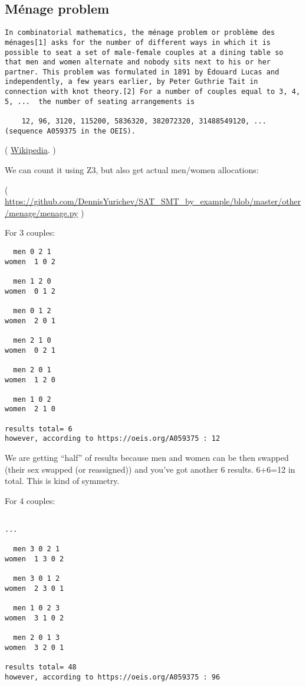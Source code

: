 \subsection{Ménage problem}

\begin{lstlisting}
In combinatorial mathematics, the ménage problem or problème des ménages[1] asks for the number of different ways in which it is possible to seat a set of male-female couples at a dining table so that men and women alternate and nobody sits next to his or her partner. This problem was formulated in 1891 by Édouard Lucas and independently, a few years earlier, by Peter Guthrie Tait in connection with knot theory.[2] For a number of couples equal to 3, 4, 5, ...  the number of seating arrangements is

    12, 96, 3120, 115200, 5836320, 382072320, 31488549120, ... (sequence A059375 in the OEIS). 
\end{lstlisting}

( \href{https://en.wikipedia.org/wiki/M%C3%A9nage_problem}{Wikipedia}. )

We can count it using Z3, but also get actual men/women allocations:



( \url{https://github.com/DennisYurichev/SAT_SMT_by_example/blob/master/other/menage/menage.py} )

For 3 couples:

\begin{lstlisting}
  men 0 2 1
women  1 0 2

  men 1 2 0
women  0 1 2

  men 0 1 2
women  2 0 1

  men 2 1 0
women  0 2 1

  men 2 0 1
women  1 2 0

  men 1 0 2
women  2 1 0

results total= 6
however, according to https://oeis.org/A059375 : 12
\end{lstlisting}

We are getting ``half'' of results because men and women can be then swapped (their sex swapped (or reassigned))
and you've got another 6 results.
6+6=12 in total.
This is kind of symmetry.

For 4 couples:

\begin{lstlisting}

...

  men 3 0 2 1
women  1 3 0 2

  men 3 0 1 2
women  2 3 0 1

  men 1 0 2 3
women  3 1 0 2

  men 2 0 1 3
women  3 2 0 1

results total= 48
however, according to https://oeis.org/A059375 : 96
\end{lstlisting}

